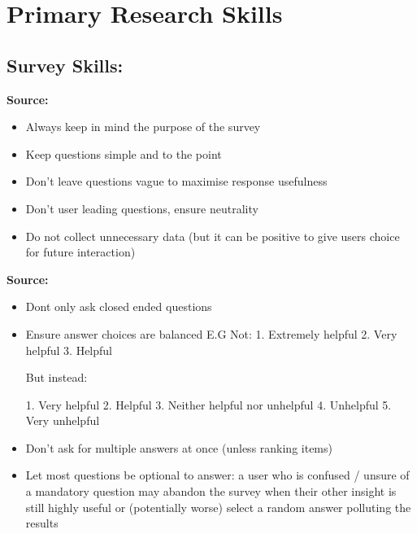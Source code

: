 \section{Primary Research Skills}
\label{research:PrimaryResearchSkills}
\subsection*{Survey Skills:}

\textbf{Source:} \cite{WritingSurveys}

\begin{itemize}
	\item Always keep in mind the purpose of the survey
	\item Keep questions simple and to the point
	\item Don't leave questions vague to maximise response usefulness\
	\item Don't user leading questions, ensure neutrality
	\item Do not collect unnecessary data (but it can be positive to give users choice for future interaction)
\end{itemize}

\textbf{Source:} \cite{HowWriteGood}
\begin{itemize}
	\item Dont only ask closed ended questions
	
	\item Ensure answer choices are balanced 
	E.G Not:
	1. Extremely helpful
	2. Very helpful
	3. Helpful
	
	But instead:
	
	1. Very helpful
	2. Helpful
	3. Neither helpful nor unhelpful
	4. Unhelpful
	5. Very unhelpful

	\item Don't ask for multiple answers at once (unless ranking items)
	\item Let most questions be optional to answer: a user who is confused / unsure of a mandatory question may abandon the survey when their other insight is still highly useful or (potentially worse) select a random answer polluting the results
\end{itemize}
